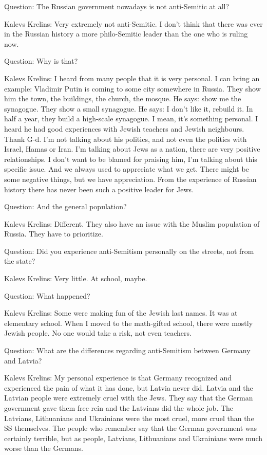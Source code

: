 Question: The Russian government nowadays is not anti-Semitic at all? 

Kalevs Krelins: Very extremely not anti-Semitic. I don’t think that there was ever in the Russian history a more philo-Semitic leader than the one who is ruling now.  

Question: Why is that? 

Kalevs Krelins: I heard from many people that it is very personal. I can bring an example: Vladimir Putin is coming to some city somewhere in Russia. They show him the town, the buildings, the church, the mosque. He says: show me the synagogue. They show a small synagogue. He says: I don’t like it, rebuild it. In half a year, they build a high-scale synagogue. I mean, it's something personal. I heard he had good experiences with Jewish teachers and Jewish neighbours. Thank G-d. I’m not talking about his politics, and not even the politics with Israel, Hamas or Iran. I’m talking about Jews as a nation, there are very positive relationships. I don’t want to be blamed for praising him, I’m talking about this specific issue. And we always used to appreciate what we get. There might be some negative things, but we have appreciation. From the experience of Russian history there has never been such a positive leader for Jews.    

Question: And the general population? 

Kalevs Krelins: Different. They also have an issue with the Muslim population of Russia. They have to prioritize. 

Question: Did you experience anti-Semitism personally on the streets, not from the state?  

Kalevs Krelins: Very little. At school, maybe.  

Question: What happened?  

Kalevs Krelins: Some were making fun of the Jewish last names. It was at elementary school. When I moved to the math-gifted school, there were mostly Jewish people. No one would take a risk, not even teachers. 

Question: What are the differences regarding anti-Semitism between Germany and Latvia?  

Kalevs Krelins: My personal experience is that Germany recognized and experienced the pain of what it has done, but Latvia never did. Latvia and the Latvian people were extremely cruel with the Jews. They say that the German government gave them free rein and the Latvians did the whole job. The Latvians, Lithuanians and Ukrainians were the most cruel, more cruel than the SS themselves. The people who remember say that the German government was certainly terrible, but as people, Latvians, Lithuanians and Ukrainians were much worse than the Germans.  

